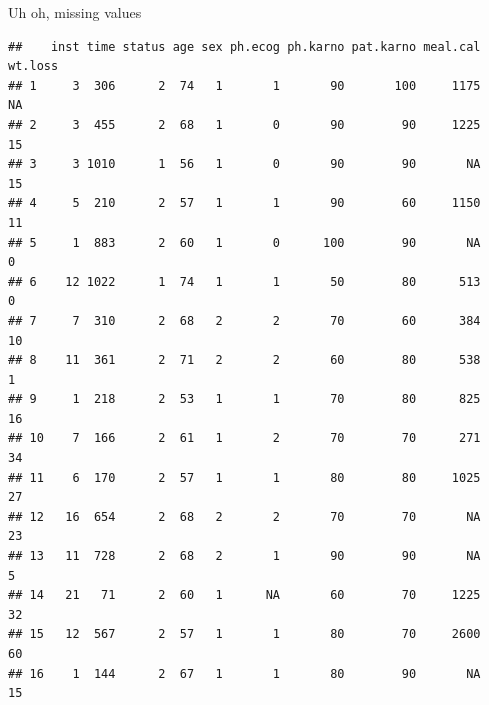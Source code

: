 \documentclass[ignorenonframetext,]{beamer}
\newenvironment{Shaded}{\begin{snugshade}}{\end{snugshade}}
\newcommand{\DecValTok}[1]{\textcolor[rgb]{0.00,0.00,0.81}{#1}}
\newcommand{\KeywordTok}[1]{\textcolor[rgb]{0.13,0.29,0.53}{\textbf{#1}}}
\newcommand{\NormalTok}[1]{#1}
\newcommand{\OperatorTok}[1]{\textcolor[rgb]{0.81,0.36,0.00}{\textbf{#1}}}
\newcommand{\StringTok}[1]{\textcolor[rgb]{0.31,0.60,0.02}{#1}}
\begin{document}
\begin{frame}[fragile]{Uh oh, missing values}
\protect\hypertarget{uh-oh-missing-values}{}

\scriptsize

\begin{Shaded}
\end{Shaded}

\begin{verbatim}
##    inst time status age sex ph.ecog ph.karno pat.karno meal.cal wt.loss
## 1     3  306      2  74   1       1       90       100     1175      NA
## 2     3  455      2  68   1       0       90        90     1225      15
## 3     3 1010      1  56   1       0       90        90       NA      15
## 4     5  210      2  57   1       1       90        60     1150      11
## 5     1  883      2  60   1       0      100        90       NA       0
## 6    12 1022      1  74   1       1       50        80      513       0
## 7     7  310      2  68   2       2       70        60      384      10
## 8    11  361      2  71   2       2       60        80      538       1
## 9     1  218      2  53   1       1       70        80      825      16
## 10    7  166      2  61   1       2       70        70      271      34
## 11    6  170      2  57   1       1       80        80     1025      27
## 12   16  654      2  68   2       2       70        70       NA      23
## 13   11  728      2  68   2       1       90        90       NA       5
## 14   21   71      2  60   1      NA       60        70     1225      32
## 15   12  567      2  57   1       1       80        70     2600      60
## 16    1  144      2  67   1       1       80        90       NA      15
\end{verbatim}

\normalsize

\end{frame}
\end{document}
